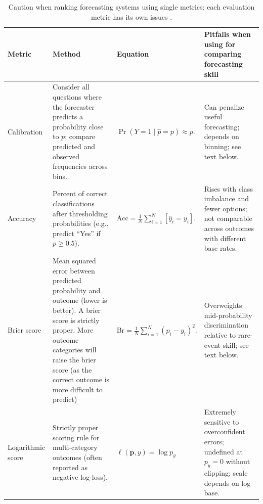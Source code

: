 \documentclass[12pt,a4paper]{article}
\begin{document}
\begin{table}[htbp]
\centering
\caption{Caution when ranking forecasting systems using single metrics: each evaluation metric has its own issues .}
\label{tab:forecasting-metrics-pitfalls}
\renewcommand{\arraystretch}{1.2}
\setlength{\tabcolsep}{5pt}
\begin{tabular}{|p{}|p{}|p{}|p{}|}
\hline
\textbf{Metric} & \textbf{Method} & \textbf{Equation} & \textbf{Pitfalls when using for comparing forecasting skill} \\
\hline
Calibration &
Consider all questions where the forecaster predicts a probability close to $p$; compare predicted and observed frequencies across bins. &
$\Pr(Y=1 \mid \hat{p}=p) \approx p.$ &
Can penalize useful forecasting; depends on binning; see text below. \\
\hline
Accuracy &
Percent of correct classifications after thresholding probabilities (e.g., predict ``Yes'' if $p \ge 0.5$). &
$\displaystyle \mathrm{Acc}=\frac{1}{N}\sum_{i=1}^N [\hat{y}_i = y_i].$ &
Rises with class imbalance and fewer options; not comparable across outcomes with different base rates. \\
\hline
Brier score &
Mean squared error between predicted probability and outcome (lower is better). A brier score is strictly proper. More outcome categories will raise the brier score (as the correct outcome is more difficult to predict)&
$\displaystyle \mathrm{Br}=\frac{1}{N}\sum_{i=1}^N (p_i - y_i)^2.$ &
Overweights mid-probability discrimination relative to rare-event skill; see text below. \\
\hline

Logarithmic score &
Strictly proper scoring rule for multi-category outcomes (often reported as negative log-loss). &
$ \ell(\mathbf{p}, y)=\log{p_{y}}$ &
Extremely sensitive to overconfident errors; undefined at $p_{y}=0$ without clipping; scale depends on log base. \\
\hline


\hline


\end{tabular}
\end{table}
\end{document}
